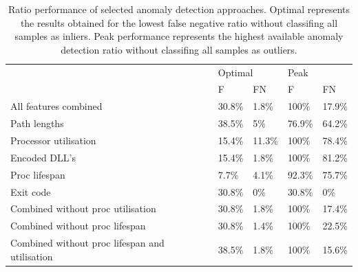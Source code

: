 \documentclass[a4paper,twoside,12pt]{book}
\begin{document}
\begin{table}
	\centering
	\caption{Ratio performance of selected anomaly detection approaches. Optimal represents the results obtained for the lowest false negative ratio
	without classifing all samples as inliers. 
	Peak performance represents the highest available anomaly detection ratio without classifing all samples as outliers.}
	
	\label{id:tab:performanceComparisonTable}
	\begin{tabular}{l|ll|ll|}
		\cline{2-5}
		\multirow{2}{*}{}                               & \multicolumn{2}{l|}{Optimal}         & \multicolumn{2}{l|}{Peak}            \\ \cline{2-5} 
														& \multicolumn{1}{l|}{F}      & FN     & \multicolumn{1}{l|}{F}      & FN     \\ \cline{2-5} 
		All features combined                           & \multicolumn{1}{l|}{30.8\%} & 1.8\%  & \multicolumn{1}{l|}{100\%}  & 17.9\% \\ \cline{2-5} 
		Path lengths                                    & \multicolumn{1}{l|}{38.5\%} & 5\%    & \multicolumn{1}{l|}{76.9\%} & 64.2\% \\ \cline{2-5} 
		Processor utilisation                           & \multicolumn{1}{l|}{15.4\%} & 11.3\% & \multicolumn{1}{l|}{100\%}  & 78.4\% \\ \cline{2-5} 
		Encoded DLL's                                   & \multicolumn{1}{l|}{15.4\%} & 1.8\%  & \multicolumn{1}{l|}{100\%}  & 81.2\% \\ \cline{2-5} 
		Proc lifespan                                   & \multicolumn{1}{l|}{7.7\%}  & 4.1\%  & \multicolumn{1}{l|}{92.3\%} & 75.7\% \\ \cline{2-5} 
		Exit code                                       & \multicolumn{1}{l|}{30.8\%} & 0\%    & \multicolumn{1}{l|}{30.8\%} & 0\%    \\ \cline{2-5} 
		Combined without proc utilisation               & \multicolumn{1}{l|}{30.8\%} & 1.8\%  & \multicolumn{1}{l|}{100\%}  & 17.4\% \\ \cline{2-5} 
		Combined without proc lifespan                  & \multicolumn{1}{l|}{30.8\%} & 1.4\%  & \multicolumn{1}{l|}{100\%}  & 22.5\% \\ \cline{2-5} 
		Combined  without proc lifespan and utilisation & \multicolumn{1}{l|}{38.5\%} & 1.8\%  & \multicolumn{1}{l|}{100\%}  & 15.6\% \\ \cline{2-5} 
		\end{tabular}
\end{table}
\end{document}

